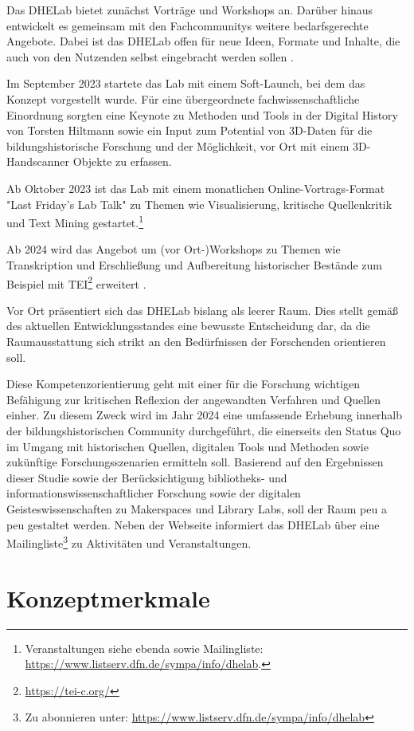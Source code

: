 \documentclass[a4paper,
fontsize=11pt,
oneside,
numbers=noperiodatend,
parskip=half-,
bibliography=totoc,
final
]{scrartcl}
\begin{document}
Das DHELab bietet zunächst Vorträge und Workshops an. Darüber hinaus
entwickelt es gemeinsam mit den Fachcommunitys weitere bedarfsgerechte
Angebote. Dabei ist das DHELab offen für neue Ideen, Formate und
Inhalte, die auch von den Nutzenden selbst eingebracht werden sollen .

Im September 2023 startete das Lab mit einem Soft-Launch, bei dem das
Konzept vorgestellt wurde. Für eine übergeordnete fachwissenschaftliche
Einordnung sorgten eine Keynote zu Methoden und Tools in der Digital
History von Torsten Hiltmann sowie ein Input zum Potential von 3D-Daten
für die bildungshistorische Forschung und der Möglichkeit, vor Ort mit
einem 3D-Handscanner Objekte zu erfassen.

Ab Oktober 2023 ist das Lab mit einem monatlichen Online-Vortrags-Format
"Last Friday's Lab Talk" zu Themen wie Visualisierung, kritische
Quellenkritik und Text Mining gestartet.\footnote{Veranstaltungen siehe
  ebenda sowie Mailingliste:
  \url{https://www.listserv.dfn.de/sympa/info/dhelab}.}

Ab 2024 wird das Angebot um (vor Ort-)Workshops zu Themen wie
Transkription und Erschließung und Aufbereitung historischer Bestände
zum Beispiel mit TEI\footnote{\url{https://tei-c.org/}} erweitert .

Vor Ort präsentiert sich das DHELab bislang als leerer Raum. Dies stellt
gemäß des aktuellen Entwicklungsstandes eine bewusste Entscheidung dar,
da die Raumausstattung sich strikt an den Bedürfnissen der Forschenden
orientieren soll.

Diese Kompetenzorientierung geht mit einer für die Forschung wichtigen
Befähigung zur kritischen Reflexion der angewandten Verfahren und
Quellen einher. Zu diesem Zweck wird im Jahr 2024 eine umfassende
Erhebung innerhalb der bildungshistorischen Community durchgeführt, die
einerseits den Status Quo im Umgang mit historischen Quellen, digitalen
Tools und Methoden sowie zukünftige Forschungsszenarien ermitteln soll.
Basierend auf den Ergebnissen dieser Studie sowie der Berücksichtigung
bibliotheks- und informationswissenschaftlicher Forschung sowie der
digitalen Geisteswissenschaften zu Makerspaces und Library Labs, soll
der Raum peu a peu gestaltet werden. Neben der Webseite informiert das
DHELab über eine Mailingliste\footnote{Zu abonnieren unter:
  \url{https://www.listserv.dfn.de/sympa/info/dhelab}} zu Aktivitäten
und Veranstaltungen.

\hypertarget{konzeptmerkmale}{%
\section{Konzeptmerkmale}\label{konzeptmerkmale}}
\end{document}
